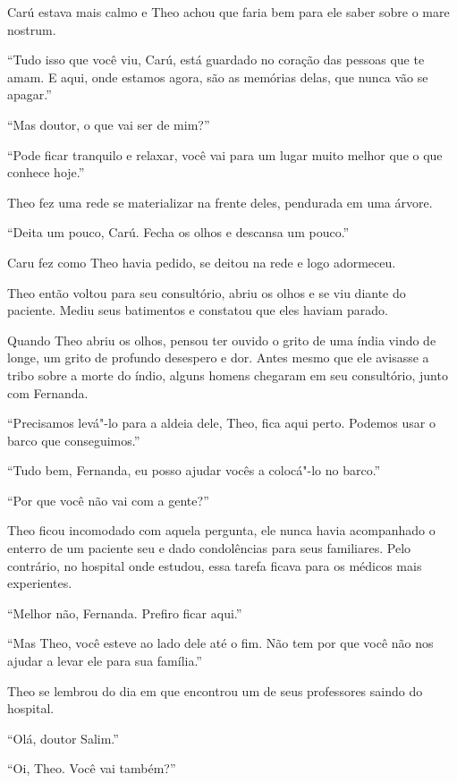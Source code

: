 Carú estava mais calmo e Theo achou que faria bem para ele saber sobre o
mare nostrum.

``Tudo isso que você viu, Carú, está guardado no coração das pessoas que
te amam. E aqui, onde estamos agora, são as memórias delas, que nunca
vão se apagar.''

``Mas doutor, o que vai ser de mim?''

``Pode ficar tranquilo e relaxar, você vai para um lugar muito melhor
que o que conhece hoje.''

Theo fez uma rede se materializar na frente deles, pendurada em uma
árvore.

``Deita um pouco, Carú. Fecha os olhos e descansa um pouco.''

Caru fez como Theo havia pedido, se deitou na rede e logo adormeceu.

Theo então voltou para seu consultório, abriu os olhos e se viu diante
do paciente. Mediu seus batimentos e constatou que eles haviam parado.

\asterisc


Quando Theo abriu os olhos, pensou ter
ouvido o grito de uma índia vindo de longe, um grito de profundo
desespero e dor. Antes mesmo que ele avisasse a tribo sobre a morte do
índio, alguns homens chegaram em seu consultório, junto com Fernanda.

``Precisamos levá"-lo para a aldeia dele, Theo, fica aqui perto. Podemos
usar o barco que conseguimos.''

``Tudo bem, Fernanda, eu posso ajudar vocês a colocá"-lo no barco.''

``Por que você não vai com a gente?''

Theo ficou incomodado com aquela pergunta, ele nunca havia acompanhado o
enterro de um paciente seu e dado condolências para seus familiares.
Pelo contrário, no hospital onde estudou, essa tarefa ficava para os
médicos mais experientes.

``Melhor não, Fernanda. Prefiro ficar aqui.''

``Mas Theo, você esteve ao lado dele até o fim. Não tem por que você não
nos ajudar a levar ele para sua família.''

Theo se lembrou do dia em que encontrou um de seus professores saindo do
hospital.

``Olá, doutor Salim.''

``Oi, Theo. Você vai também?''

